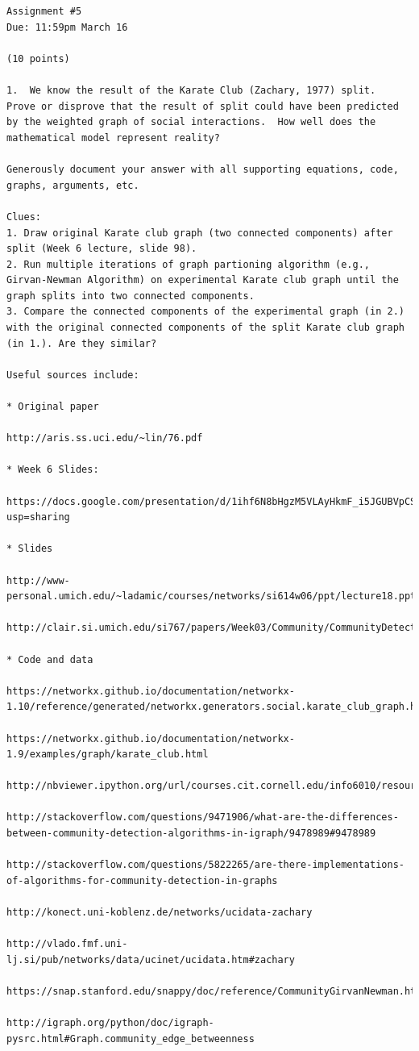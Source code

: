\documentclass[letterpaper,11pt]{article}
\begin{document}
\begin{verbatim}


Assignment #5
Due: 11:59pm March 16

(10 points)

1.  We know the result of the Karate Club (Zachary, 1977) split.
Prove or disprove that the result of split could have been predicted
by the weighted graph of social interactions.  How well does the
mathematical model represent reality?

Generously document your answer with all supporting equations, code,
graphs, arguments, etc.

Clues: 
1. Draw original Karate club graph (two connected components) after split (Week 6 lecture, slide 98).
2. Run multiple iterations of graph partioning algorithm (e.g., Girvan-Newman Algorithm) on experimental Karate club graph until the graph splits into two connected components.
3. Compare the connected components of the experimental graph (in 2.) with the original connected components of the split Karate club graph (in 1.). Are they similar?

Useful sources include:

* Original paper

http://aris.ss.uci.edu/~lin/76.pdf

* Week 6 Slides:

https://docs.google.com/presentation/d/1ihf6N8bHgzM5VLAyHkmF_i5JGUBVpCSdsvYpk8XgHwo/edit?usp=sharing

* Slides

http://www-personal.umich.edu/~ladamic/courses/networks/si614w06/ppt/lecture18.ppt

http://clair.si.umich.edu/si767/papers/Week03/Community/CommunityDetection.pptx

* Code and data

https://networkx.github.io/documentation/networkx-1.10/reference/generated/networkx.generators.social.karate_club_graph.html

https://networkx.github.io/documentation/networkx-1.9/examples/graph/karate_club.html

http://nbviewer.ipython.org/url/courses.cit.cornell.edu/info6010/resources/11notes.ipynb

http://stackoverflow.com/questions/9471906/what-are-the-differences-between-community-detection-algorithms-in-igraph/9478989#9478989

http://stackoverflow.com/questions/5822265/are-there-implementations-of-algorithms-for-community-detection-in-graphs

http://konect.uni-koblenz.de/networks/ucidata-zachary

http://vlado.fmf.uni-lj.si/pub/networks/data/ucinet/ucidata.htm#zachary

https://snap.stanford.edu/snappy/doc/reference/CommunityGirvanNewman.html

http://igraph.org/python/doc/igraph-pysrc.html#Graph.community_edge_betweenness

\end{verbatim}
\end{document}
